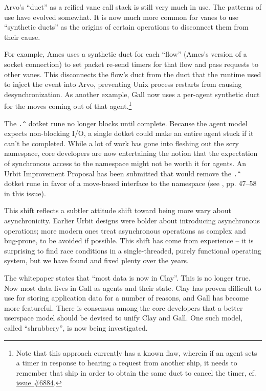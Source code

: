 \documentclass[twoside]{article}
\begin{document}
Arvo's ``duct'' as a reified vane call stack is still very much in use.  The patterns of use have evolved somewhat.  It is now much more common for vanes to use ``synthetic ducts'' as the origins of certain operations to disconnect them from their cause.

For example, Ames uses a synthetic duct for each ``flow'' (Ames's version of a socket connection) to set packet re-send timers for that flow and pass requests to other vanes.  This disconnects the flow's duct from the duct that the runtime used to inject the event into Arvo, preventing Unix process restarts from causing desynchronization.  As another example, Gall now uses a per-agent synthetic duct for the moves coming out of that agent.\footnote{Note that this approach currently has a known flaw, wherein if an agent sets a timer in response to hearing a request from another ship, it needs to remember that ship in order to obtain the same duct to cancel the timer, cf. \href{https://github.com/urbit/urbit/issues/6884}{issue \#6884}.}

The \lstinline[style=inlinecode]{.^} dotket rune no longer blocks until complete.  Because the agent model expects non-blocking I/O, a single dotket could make an entire agent stuck if it can't be completed.  While a lot of work has gone into fleshing out the scry namespace, core developers are now entertaining the notion that the expectation of synchronous access to the namespace might not be worth it for agents.  An Urbit Improvement Proposal has been submitted that would remove the \lstinline[style=inlinecode]{.^} dotket rune in favor of a move-based interface to the namespace (see \citet{Blackman2024a}, pp. 47–58 in this issue).

This shift reflects a subtler attitude shift toward being more wary about asynchronicity.  Earlier Urbit designs were bolder about introducing asynchronous operations; more modern ones treat asynchronous operations as complex and bug-prone, to be avoided if possible.  This shift has come from experience – it is surprising to find race conditions in a single-threaded, purely functional operating system, but we have found and fixed plenty over the years.  

The whitepaper states that ``most data is now in Clay''.  This is no longer true.  Now most data lives in Gall as agents and their state.  Clay has proven difficult to use for storing application data for a number of reasons, and Gall has become more featureful.  There is consensus among the core developers that a better userspace model should be devised to unify Clay and Gall.  One such model, called ``shrubbery'', is now being investigated.
\end{document}
